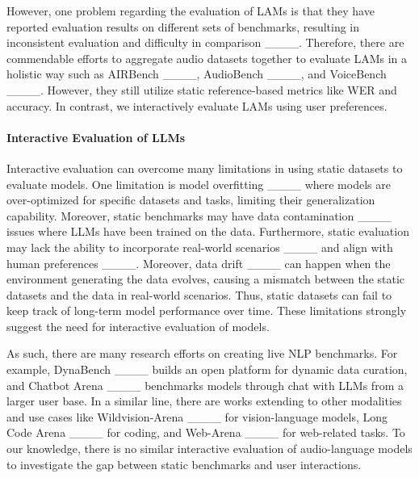 However, one problem regarding the evaluation of LAMs is that they have reported evaluation results on different sets of benchmarks, resulting in inconsistent evaluation and difficulty in comparison ____. Therefore, there are commendable efforts to aggregate audio datasets together to evaluate LAMs in a holistic way such as AIRBench ____, AudioBench ____, and VoiceBench ____. However, they still utilize static reference-based metrics like WER and accuracy. In contrast, we interactively evaluate LAMs using user preferences.

\paragraph{Interactive Evaluation of LLMs}
Interactive evaluation can overcome many limitations in using static datasets to evaluate models. One limitation is model overfitting ____ where models are over-optimized for specific datasets and tasks, limiting their generalization capability. Moreover, static benchmarks may have data contamination ____ issues where LLMs have been trained on the data. Furthermore, static evaluation may lack the ability to incorporate real-world scenarios ____ and align with human preferences ____. Moreover, data drift ____ can happen when the environment generating the data evolves, causing a mismatch between the static datasets and the data in real-world scenarios. Thus, static datasets can fail to keep track of long-term model performance over time. These limitations strongly suggest the need for interactive evaluation of models.

As such, there are many research efforts on creating live NLP benchmarks. For example, DynaBench ____ builds an open platform for dynamic data curation, and Chatbot Arena ____ benchmarks models through chat with LLMs from a larger user base. In a similar line, there are works extending to other modalities and use cases like Wildvision-Arena ____ for vision-language models, Long Code Arena ____ for coding, and Web-Arena ____ for web-related tasks. To our knowledge, there is no similar interactive evaluation of audio-language models to investigate the gap between static benchmarks and user interactions.